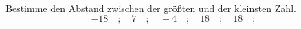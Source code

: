 \begin{aufgabe} ~ \\ 
Bestimme den Abstand zwischen der größten und der kleinsten Zahl.\[-18\quad ; \quad7\quad ; \quad-4\quad ; \quad18\quad ; \quad18\quad ; \quad\]\underline{\hspace{12cm}}\end{aufgabe} 
